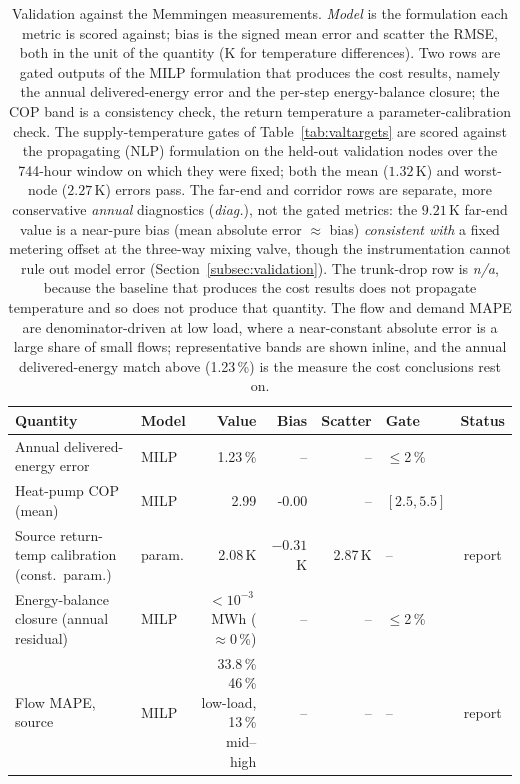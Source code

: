\documentclass[a4paper,fleqn]{cas-sc}
\renewcommand{\checkmark}{\ding{51}}
\begin{document}
\begin{table}[t]
\centering
\caption{Validation against the Memmingen measurements. \emph{Model} is the formulation each
metric is scored against; bias is the signed mean error and scatter the RMSE, both in the unit of
the quantity (K for temperature differences). Two rows are gated outputs of the MILP formulation
that produces the cost results, namely the annual delivered-energy error and the per-step
energy-balance closure; the COP band is a consistency check, the return temperature a
parameter-calibration check. The supply-temperature gates of Table~\ref{tab:valtargets} are
scored against the propagating (NLP) formulation on the held-out validation nodes over the
744-hour window on which they were fixed; both the mean ($1.32$\,K) and worst-node ($2.27$\,K)
errors pass. The far-end and corridor rows are separate, more conservative \emph{annual}
diagnostics (\emph{diag.}), not the gated metrics: the $9.21$\,K far-end value is a near-pure
bias (mean absolute error $\approx$ bias) \emph{consistent with} a fixed metering offset at the
three-way mixing valve, though the instrumentation cannot rule out model error
(Section~\ref{subsec:validation}). The trunk-drop row is \emph{n/a}, because the baseline that
produces the cost results does not propagate temperature and so does not produce that quantity. The flow and demand MAPE are denominator-driven at low load, where a
near-constant absolute error is a large share of small flows; representative bands are shown
inline, and the annual delivered-energy match above (1.23\,\%) is the measure the cost
conclusions rest on.}
\label{tab:validation}
\footnotesize
\setlength{\tabcolsep}{4pt}
\begin{tabular}{@{}p{4.9cm}lrrrlc@{}}
\hline
Quantity & Model & Value & Bias & Scatter & Gate & Status \\
\hline
Annual delivered-energy error & MILP & 1.23\,\% & -- & -- & $\le$2\,\% & \checkmark \\
Heat-pump COP (mean) & MILP & 2.99 & -0.00 & -- & $[2.5,5.5]$ & \checkmark \\
Source return-temp calibration (const.\ param.) & param. & 2.08\,K & $-0.31$\,K & 2.87\,K & -- & report \\
Energy-balance closure (annual residual) & MILP & $<10^{-3}$\,MWh ($\approx$0\,\%) & -- & -- & $\le$2\,\% & \checkmark \\
Flow MAPE, source & MILP & \makecell[r]{33.8\,\%\\[1pt]{\scriptsize 46\,\% low-load, 13\,\% mid--high}} & -- & -- & -- & report \\

\end{tabular}
\end{table}
\end{document}
